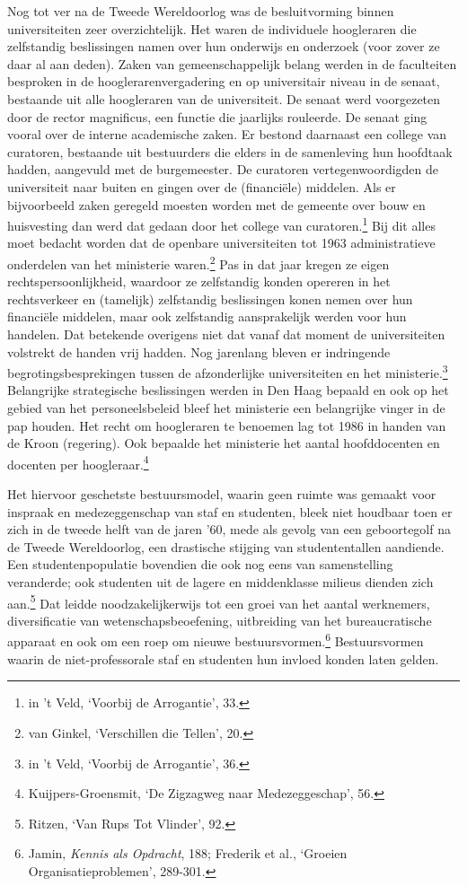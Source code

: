 \documentclass[smallauthor, chapterhaspagenum, nochapterinheader, pagenuminheader,  bigchapnum,medium2, tocpages, garamond, titleinheader]{jote-book}
\begin{document}
	Nog tot ver na de Tweede Wereldoorlog was de besluitvorming binnen universiteiten zeer overzichtelijk. Het waren de individuele hoogleraren die zelfstandig beslissingen namen over hun onderwijs en onderzoek (voor zover ze daar al aan deden). Zaken van gemeenschappelijk belang werden in de faculteiten besproken in de hooglerarenvergadering en op universitair niveau in de senaat, bestaande uit alle hoogleraren van de universiteit. De senaat werd voorgezeten door de rector magnificus, een functie die jaarlijks rouleerde. De senaat ging vooral over de interne academische zaken. Er bestond daarnaast een college van curatoren, bestaande uit bestuurders die elders in de samenleving hun hoofdtaak hadden, aangevuld met de burgemeester. De curatoren vertegenwoordigden de universiteit naar buiten en gingen over de (financiële) middelen. Als er bijvoorbeeld zaken geregeld moesten worden met de gemeente over bouw en huisvesting dan werd dat gedaan door het college van curatoren.\footnote{in 't Veld, ‘Voorbij de Arrogantie', 33.} Bij dit alles moet bedacht worden dat de openbare universiteiten tot 1963 administratieve onderdelen van het ministerie waren.\footnote{van Ginkel, ‘Verschillen die Tellen', 20.} Pas in dat jaar kregen ze eigen rechtspersoonlijkheid, waardoor ze zelfstandig konden opereren in het rechtsverkeer en (tamelijk) zelfstandig beslissingen konen nemen over hun financiële middelen, maar ook zelfstandig aansprakelijk werden voor hun handelen. Dat betekende overigens niet dat vanaf dat moment de universiteiten volstrekt de handen vrij hadden. Nog jarenlang bleven er indringende begrotingsbesprekingen tussen de afzonderlijke universiteiten en het ministerie.\footnote{in 't Veld, ‘Voorbij de Arrogantie', 36.} Belangrijke strategische beslissingen werden in Den Haag bepaald en ook op het gebied van het personeelsbeleid bleef het ministerie een belangrijke vinger in de pap houden. Het recht om hoogleraren te benoemen lag tot 1986 in handen van de Kroon (regering). Ook bepaalde het ministerie het aantal hoofddocenten en docenten per hoogleraar.\footnote{Kuijpers-Groensmit, ‘De Zigzagweg naar Medezeggeschap', 56.}

	\enlargethispage{\baselineskip}\checkandfixthelayout

	Het hiervoor geschetste bestuursmodel, waarin geen ruimte was gemaakt voor inspraak en medezeggenschap van staf en studenten, bleek niet houdbaar toen er zich in de tweede helft van de jaren '60, mede als gevolg van een geboortegolf na de Tweede Wereldoorlog, een drastische stijging van studententallen aandiende. Een studentenpopulatie bovendien die ook nog eens van samenstelling veranderde; ook studenten uit de lagere en middenklasse milieus dienden zich aan.\footnote{Ritzen, ‘Van Rups Tot Vlinder', 92.} Dat leidde noodzakelijkerwijs tot een groei van het aantal werknemers, diversificatie van wetenschapsbeoefening, uitbreiding van het bureaucratische apparaat en ook om een roep om nieuwe bestuursvormen.\footnote{Jamin, \emph{Kennis als Opdracht}, 188; Frederik et al., ‘Groeien Organisatieproblemen', 289-301.} Bestuursvormen waarin de niet-professorale staf en studenten hun invloed konden laten gelden.
\end{document}
